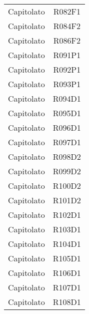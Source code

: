 \documentclass[../analisi-dei-requisiti.tex]{subfiles}
\begin{document}
\begin{longtable}[H]{c|c}
                                Capitolato & R082F1                               \\
                                Capitolato & R084F2                               \\
                                Capitolato & R086F2                               \\
                                Capitolato & R091P1                               \\
                                Capitolato & R092P1                               \\
                                Capitolato & R093P1                               \\
                                Capitolato & R094D1                               \\
                                Capitolato & R095D1                               \\
                                Capitolato & R096D1                               \\
                                Capitolato & R097D1                               \\
                                Capitolato & R098D2                               \\
                                Capitolato & R099D2                               \\
                                Capitolato & R100D2                               \\
                                Capitolato & R101D2                               \\
                                Capitolato & R102D1                               \\
                                Capitolato & R103D1                               \\
                                Capitolato & R104D1                               \\
                                Capitolato & R105D1                               \\
                                Capitolato & R106D1                               \\
                                Capitolato & R107D1                               \\
                                Capitolato & R108D1                               \\

\end{longtable}
\end{document}
